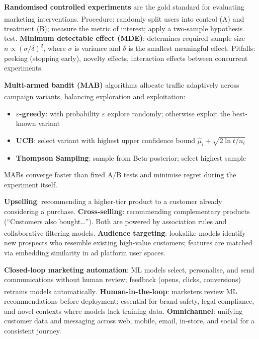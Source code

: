 \begin{tcbitemize}[ skin=sectionraster ]

    \tcbitem[title=A/B Testing and Experiments, raster multicolumn=3]
    \textbf{Randomised controlled experiments} are the gold standard for evaluating marketing interventions\textsuperscript{\cite[][pp.~178--183]{chaffeyDigitalBusinessECommerce2019}}.
    Procedure: randomly split users into control (A) and treatment (B); measure the metric of interest; apply a two-sample hypothesis test.
    \textbf{Minimum detectable effect (MDE)}: determines required sample size $n \propto (\sigma / \delta)^2$, where $\sigma$ is variance and $\delta$ is the smallest meaningful effect.
    Pitfalls: peeking (stopping early), novelty effects, interaction effects between concurrent experiments.

    \tcbitem[title=Multi-Armed Bandits for Campaigns, raster multicolumn=3]
    \textbf{Multi-armed bandit (MAB)} algorithms allocate traffic adaptively across campaign variants, balancing exploration and exploitation\textsuperscript{\cite[][pp.~458--462]{suttonReinforcementLearningIntroduction2018}}:
    \begin{itemize}
        \item \textbf{$\varepsilon$-greedy}: with probability $\varepsilon$ explore randomly; otherwise exploit the best-known variant
        \item \textbf{UCB}: select variant with highest upper confidence bound $\hat{\mu}_i + \sqrt{2\ln t / n_i}$
        \item \textbf{Thompson Sampling}: sample from Beta posterior; select highest sample
    \end{itemize}
    MABs converge faster than fixed A/B tests and minimise regret during the experiment itself.

    \tcbitem[title={Upselling, Cross-selling and Targeting}, raster multicolumn=3]
    \textbf{Upselling}: recommending a higher-tier product to a customer already considering a purchase.
    \textbf{Cross-selling}: recommending complementary products (``Customers also bought\ldots'').
    Both are powered by association rules and collaborative filtering models\textsuperscript{\cite[][pp.~185--190]{chaffeyDigitalBusinessECommerce2019}}.
    \textbf{Audience targeting}: lookalike models identify new prospects who resemble existing high-value customers; features are matched via embedding similarity in ad platform user spaces.

    \tcbitem[title=Closed-Loop vs.\ Human-in-the-Loop, raster multicolumn=3]
    \textbf{Closed-loop marketing automation}: ML models select, personalise, and send communications without human review; feedback (opens, clicks, conversions) retrains models automatically\textsuperscript{\cite[][pp.~200--205]{chaffeyDigitalBusinessECommerce2019}}.
    \textbf{Human-in-the-loop}: marketers review ML recommendations before deployment; essential for brand safety, legal compliance, and novel contexts where models lack training data.
    \textbf{Omnichannel}: unifying customer data and messaging across web, mobile, email, in-store, and social for a consistent journey.

\end{tcbitemize}

